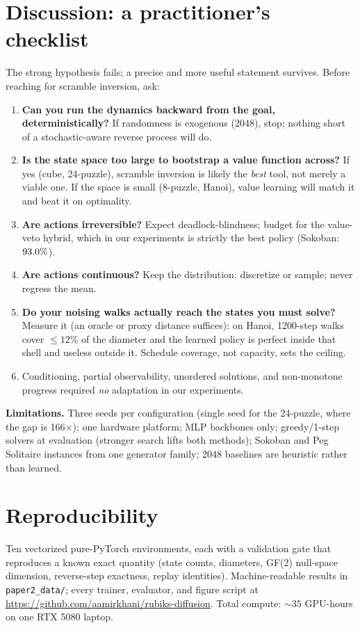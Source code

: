 \documentclass[11pt]{article}
\begin{document}
\section{Discussion: a practitioner's checklist}
\label{sec:discussion}

The strong hypothesis fails; a precise and more useful statement survives.
Before reaching for scramble inversion, ask:
\begin{enumerate}
\item \textbf{Can you run the dynamics backward from the goal,
deterministically?} If randomness is exogenous (2048), stop; nothing short
of a stochastic-aware reverse process will do.
\item \textbf{Is the state space too large to bootstrap a value function
across?} If yes (cube, 24-puzzle), scramble inversion is likely the
\emph{best} tool, not merely a viable one. If the space is small (8-puzzle,
Hanoi), value learning will match it and beat it on optimality.
\item \textbf{Are actions irreversible?} Expect deadlock-blindness; budget
for the value-veto hybrid, which in our experiments is strictly the best
policy (Sokoban: $93.0\%$).
\item \textbf{Are actions continuous?} Keep the distribution: discretize or
sample; never regress the mean.
\item \textbf{Do your noising walks actually reach the states you must
solve?} Measure it (an oracle or proxy distance suffices): on Hanoi,
1200-step walks cover ${\le}12\%$ of the diameter and the learned policy is
perfect inside that shell and useless outside it. Schedule coverage, not
capacity, sets the ceiling.
\item Conditioning, partial observability, unordered solutions, and
non-monotone progress required \emph{no} adaptation in our experiments.
\end{enumerate}

\textbf{Limitations.} Three seeds per configuration (single seed for the
24-puzzle, where the gap is 166$\times$); one hardware platform; MLP
backbones only; greedy/1-step solvers at evaluation (stronger search lifts
both methods); Sokoban and Peg Solitaire instances from one generator
family; 2048 baselines are heuristic rather than learned.

\section{Reproducibility}
Ten vectorized pure-PyTorch environments, each with a validation gate that
reproduces a known exact quantity (state counts, diameters, GF(2) null-space
dimension, reverse-step exactness, replay identities). Machine-readable
results in \texttt{paper2\_data/}; every trainer, evaluator, and figure
script at \url{https://github.com/aamirkhani/rubiks-diffusion}. Total
compute: ${\sim}35$ GPU-hours on one RTX 5080 laptop.
\end{document}
